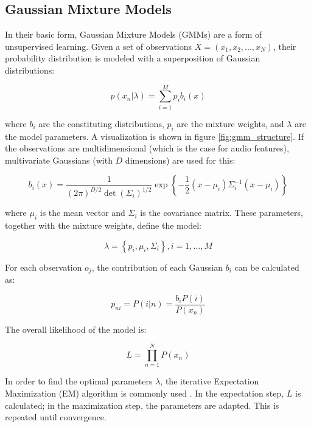 \subsection{Gaussian Mixture Models}
    In their basic form, Gaussian Mixture Models (GMMs) are a form of unsupervised learning. 
    Given a set of observations $X = (x_1, x_2, ..., x_N)$, their probability distribution is modeled with a superposition of Gaussian distributions:

    \begin{equation}
        p(x_n | \lambda ) = \sum_{i=1}^M p_i b_i(x)
    \end{equation}

    where $b_i$ are the constituting distributions, $p_i$ are the mixture weights, and $\lambda$ are the model parameters. 
    A visualization is shown in figure \ref{fig:gmm_structure}. 
    If the observations are multidimensional (which is the case for audio features), multivariate Gaussians (with $D$ dimensions) are used for this:

    \begin{equation}
        b_i(x) = \frac{1}{ (2\pi)^{D/2} \det(\Sigma_i)^{1/2}} \exp \left\{-\frac{1}{2} (x - \mu_i) \Sigma_i^{-1} (x - \mu_i) \right\}
    \end{equation}

    where $\mu_i$ is the mean vector and $\Sigma_i$ is the covariance matrix.
    These parameters, together with the mixture weights, define the model:

    \begin{equation}
        \lambda = \left\{ p_i, \mu_i, \Sigma_i \right\}, i = 1,...,M
    \end{equation}

    For each observation $o_j$, the contribution of each Gaussian $b_i$ can be calculated as:

    \begin{equation}
        p_{ni} = P(i | n) = \frac{b_i P(i)}{P(x_n)} 
    \end{equation}

    The overall likelihood of the model is:
   
    \begin{equation}
        L = \prod_{n=1}^N P(x_n)
    \end{equation}

    In order to find the optimal parameters $\lambda$, the iterative Expectation Maximization (EM) algorithm is commonly used \cite{dempster_laird}. 
    In the expectation step, $L$ is calculated; in the maximization step, the parameters are adapted.
    This is repeated until convergence. 


